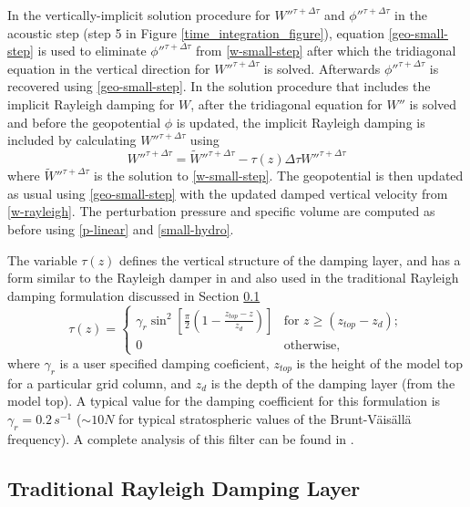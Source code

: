 In the vertically-implicit solution procedure for $W''^{\tau+\Delta
\tau}$ and $\phi''^{\tau+\Delta \tau}$ in the acoustic step (step 5 in
Figure \ref{time_integration_figure}), equation \eqref{geo-small-step}
is used to eliminate $\phi''^{\tau+\Delta \tau}$ from
\eqref{w-small-step} after which the tridiagonal equation in the
vertical direction for
$W''^{\tau+\Delta \tau}$ is solved.  Afterwards $\phi''^{\tau+\Delta \tau}$ is
recovered using \eqref{geo-small-step}.  In the solution procedure that
includes the implicit Rayleigh damping for $W$, after the tridiagonal
equation for $W''$ %
is solved and before the
geopotential $\phi$ is updated, the implicit Rayleigh damping is
included by calculating $W''^{\tau+\Delta \tau}$ using
%
\begin{equation}
W''^{\tau+\Delta \tau} = \tilde{W}''^{\tau+\Delta \tau} 
-\tau(z) \Delta \tau W''^{\tau+\Delta \tau}
\label{w-rayleigh}
\end{equation}
%
where $\tilde{W}''^{\tau+\Delta \tau}$ is the solution to
\eqref{w-small-step}.  The geopotential is then updated as usual using
\eqref{geo-small-step} with the updated damped vertical velocity from
\eqref{w-rayleigh}.
The perturbation pressure and specific volume
are computed as before using \eqref{p-linear} and \eqref{small-hydro}.

The variable $\tau(z)$ defines the vertical structure of the damping
layer, and has a form similar to the Rayleigh damper in
\citet{durran_klemp83} and also used in the traditional Rayleigh damping
formulation discussed in Section \ref{traditional-rayleigh}
%
\[ \tau (z) = \left\{ \begin{array}{cc}
         \gamma_r\sin^2 \left[ \frac{\pi}{2} 
\left( 1 - \frac{z_{top}-z}{z_d} \right) \right] & 
\mbox{for $z \geq (z_{top}-z_d)$};\\ 
        0 & \mbox{otherwise}, \end{array} \right. \] 
%
where $\gamma_r$ is a user specified damping coeficient, $z_{top}$ is
the height of the model top for a particular grid column, and $z_d$ is
the depth of the damping layer (from the model top).  A typical value
for the damping coefficient for this formulation is 
$\gamma_r = 0.2 \,s^{-1}$ ($\sim 10N$ for typical stratospheric values of
the Brunt-V\"ais\"all\"a frequency).
A complete
analysis of this filter can be found in \citet{klemp_et_al_2008}.

\subsection{Traditional Rayleigh Damping Layer}
\label{traditional-rayleigh}

